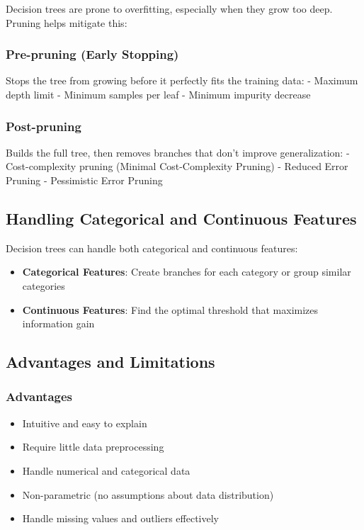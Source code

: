 \documentclass[
  letterpaper,
  DIV=11,
  numbers=noendperiod]{scrreprt}
\providecommand{\tightlist}{%
  \setlength{\itemsep}{0pt}\setlength{\parskip}{0pt}}\usepackage{longtable,booktabs,array}
\begin{document}
Decision trees are prone to overfitting, especially when they grow too
deep. Pruning helps mitigate this:

\subsubsection{Pre-pruning (Early
Stopping)}\label{pre-pruning-early-stopping}

Stops the tree from growing before it perfectly fits the training data:
- Maximum depth limit - Minimum samples per leaf - Minimum impurity
decrease

\subsubsection{Post-pruning}\label{post-pruning}

Builds the full tree, then removes branches that don't improve
generalization: - Cost-complexity pruning (Minimal Cost-Complexity
Pruning) - Reduced Error Pruning - Pessimistic Error Pruning

\subsection{Handling Categorical and Continuous
Features}\label{handling-categorical-and-continuous-features}

Decision trees can handle both categorical and continuous features:

\begin{itemize}
\tightlist
\item
  \textbf{Categorical Features}: Create branches for each category or
  group similar categories
\item
  \textbf{Continuous Features}: Find the optimal threshold that
  maximizes information gain
\end{itemize}

\subsection{Advantages and
Limitations}\label{advantages-and-limitations}

\subsubsection{Advantages}\label{advantages-2}

\begin{itemize}
\tightlist
\item
  Intuitive and easy to explain
\item
  Require little data preprocessing
\item
  Handle numerical and categorical data
\item
  Non-parametric (no assumptions about data distribution)
\item
  Handle missing values and outliers effectively
\end{itemize}
\end{document}
